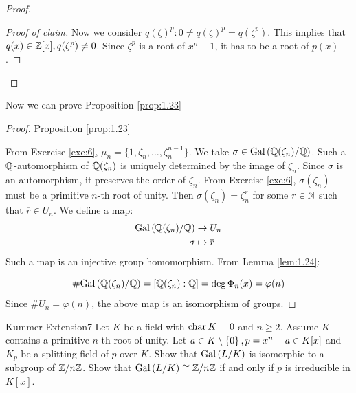 \documentclass[twoside = false,	%
		headsepline,		%
		parskip = true,
		]{scrbook}						%
\begin{document}
\begin{proof}
\begin{proof}[Proof of claim]
                Now we consider $\overline{q}(\zeta)^p: 0 \neq \overline{q}(\zeta)^p = \overline{q}(\zeta^p)$. This implies that $q(x) \in \mathbb Z[x], q(\zeta^p) \neq 0$. Since $\zeta^p$ is a root of $x^n - 1$, it has to be a root of $p(x)$.
            \end{proof}
        \end{proof}
        
        Now we can prove Proposition \ref{prop:1.23}
        
        \begin{proof}
            Proposition \ref{prop:1.23}
            
            From Exercise \ref{exe:6}, $\mu_n = \{1,\zeta_n,\dots,\zeta_n^{n-1}\}$. We take $\sigma \in \mathrm{Gal}\left( \mathbb Q(\zeta_n)/\mathbb Q\right)$. Such a $\mathbb Q$-automorphism of $\mathbb Q(\zeta_n)$ is uniquely determined by the image of $\zeta_n$. Since $\sigma$ is an automorphism, it preserves the order of $\zeta_n$. From Exercise \ref{exe:6}, $\sigma(\zeta_n)$ must be a primitive $n$-th root of unity. Then $\sigma(\zeta_n) = \zeta_n^r$ for some $r \in \mathbb N$ such that $\overline{r} \in U_n$. We define a map:
            \begin{equation*}
                \begin{split}
                    \mathrm{Gal}\left( \mathbb Q(\zeta_n)/\mathbb Q\right) &\rightarrow U_n \\
                    \sigma &\mapsto \overline{r}
                \end{split}
            \end{equation*}
            Such a map is an injective group homomorphism. From Lemma \ref{lem:1.24}:
            
            \begin{equation*}
                \#\mathrm{Gal}\left( \mathbb Q(\zeta_n)/\mathbb Q\right) = [\mathbb Q(\zeta_n) : \mathbb Q] = \deg \Phi_n(x) = \varphi(n)
            \end{equation*}
            Since $\#U_n = \varphi(n)$, the above map is an isomorphism of groups.
        \end{proof}
        \begin{exercise}{Kummer-Extension}{7}
            Let $K$ be a field with $\mathrm{char} \, K = 0$ and $n\geq 2$. Assume $K$ contains a primitive $n$-th root of unity. Let $a\in K\setminus\left\{ 0\right\}, p=x^n-a\in K[x]$ and $K_p$ be a splitting field of $p$ over $K$. Show that $\mathrm{Gal}\left( L/K\right)$ is isomorphic to a subgroup of $\mathbb Z/n\mathbb Z$. Show that $\mathrm{Gal}\left( L/K\right)\cong \mathbb Z/n\mathbb Z$ if and only if $p$ is irreducible in $K[x]$.
        \end{exercise}
\end{document}
